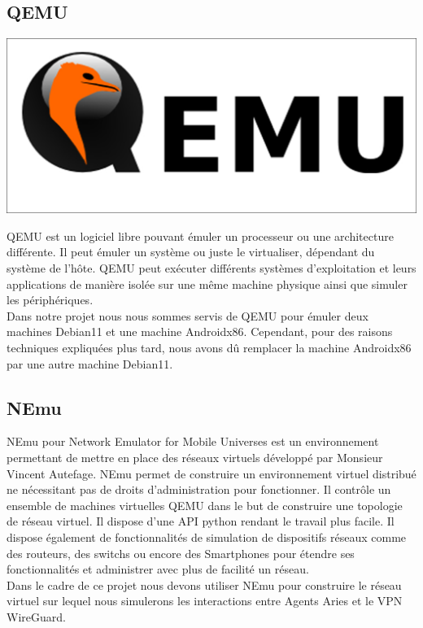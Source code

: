 \documentclass[12pt, openany]{report}
\begin{document}
\begin{flushleft}
\begin{itemize}
\begin{center}
\end{center}

\end{itemize} 
\end{flushleft}

\subsection{QEMU}
\noindent 
\begin{center}
\includegraphics[scale=0.2]{qemu.png}
\end{center}
\begin{flushleft}
QEMU est un logiciel libre  pouvant émuler un processeur ou une architecture différente. Il peut émuler un système ou juste le virtualiser, dépendant du système de l'hôte. QEMU peut exécuter différents systèmes d'exploitation et leurs applications de manière isolée sur une même machine physique ainsi que simuler les périphériques. \\
Dans notre projet nous nous sommes servis de QEMU pour émuler deux machines Debian11 et une machine Androidx86. Cependant, pour des raisons techniques expliquées plus tard, nous avons dû remplacer la machine Androidx86 par une autre machine Debian11. 
\end{flushleft}

\subsection{NEmu}
\noindent 
\begin{flushleft}
NEmu pour Network Emulator for Mobile Universes est un environnement permettant de mettre en place des réseaux virtuels développé par Monsieur Vincent Autefage. NEmu permet de construire un environnement virtuel distribué ne nécessitant pas de droits d'administration pour fonctionner. Il contrôle un ensemble de machines virtuelles QEMU dans le but de construire une topologie de réseau virtuel. Il dispose d'une API python rendant le travail plus facile. Il dispose également de fonctionnalités de simulation de dispositifs réseaux comme des routeurs, des switchs ou encore des Smartphones pour étendre ses fonctionnalités et administrer avec plus de facilité un réseau. \\
Dans le cadre de ce projet nous devons utiliser NEmu pour construire le réseau virtuel sur lequel nous simulerons les interactions entre Agents Aries et le VPN WireGuard.
\end{flushleft}
\end{document}
